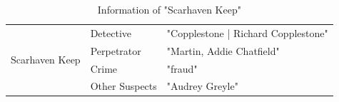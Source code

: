 \documentclass{article}
\begin{document}
\begin{table}[htbp]
\centering
\caption{Information of "Scarhaven Keep"}
\begin{tabular}{@{}l|l|l@{}}
\toprule
\multirow{6}{*}{Scarhaven Keep} & Detective      & "Copplestone | Richard Copplestone"                                                                                                                                                                                                                                                                                                                                                                                                                                                                                                                                                                    \\ \cmidrule(l){2-3} 
                                & Perpetrator    & "Martin, Addie Chatfield"                                                                                                                                                                                                                                                                                                                                                                                                                                                                                                                                                                            \\ \cmidrule(l){2-3} 
                                & Crime          & "fraud"                                                                                                                                                                                                                                                                                                                                                                                                                                                                                                                                                                                              \\ \cmidrule(l){2-3} 
                                & Other Suspects & "Audrey Greyle"                                                                                                                                                                                                                                                                                                                                                                                                                                                                                                                                                                                      \\ \cmidrule(l){2-3} 

\end{tabular}
\end{table}
\end{document}
